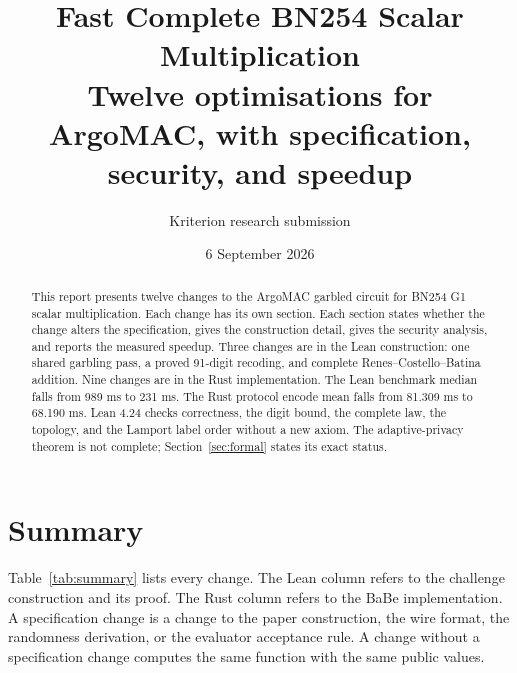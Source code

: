 \documentclass[10pt]{article}
\title{\vspace{-16mm}\textbf{Fast Complete BN254 Scalar Multiplication}\\
\large Twelve optimisations for ArgoMAC, with specification, security, and speedup}
\author{Kriterion research submission}
\date{6 September 2026}
\begin{document}
\maketitle

\begin{abstract}
This report presents twelve changes to the ArgoMAC garbled circuit for BN254 G1 scalar multiplication.
Each change has its own section.
Each section states whether the change alters the specification, gives the construction detail, gives the security analysis, and reports the measured speedup.
Three changes are in the Lean construction: one shared garbling pass, a proved 91-digit recoding, and complete Renes--Costello--Batina addition.
Nine changes are in the Rust implementation.
The Lean benchmark median falls from 989 ms to 231 ms.
The Rust protocol encode mean falls from 81.309 ms to 68.190 ms.
Lean 4.24 checks correctness, the digit bound, the complete law, the topology, and the Lamport label order without a new axiom.
The adaptive-privacy theorem is not complete; Section~\ref{sec:formal} states its exact status.
\end{abstract}

\section{Summary}

Table~\ref{tab:summary} lists every change.
The Lean column refers to the challenge construction and its proof.
The Rust column refers to the BaBe implementation.
A specification change is a change to the paper construction, the wire format, the randomness derivation, or the evaluator acceptance rule.
A change without a specification change computes the same function with the same public values.
\end{document}
